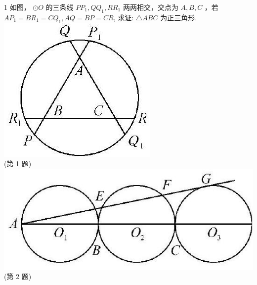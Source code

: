 \documentclass[10pt]{article}
\begin{document}
1 如图， $\odot O$ 的三条线 $P P_{1}, Q Q_{1}, R R_{1}$ 两两相交，交点为 $A, B, C$ ，若 $A P_{1}=B R_{1}=C Q_{1}, A Q=B P=C R$, 求证: $\triangle A B C$ 为正三角形.\\
\includegraphics[max width=\textwidth, center]{2024_10_30_66b8e5e701da2093c133g-056(2)}\\
(第 1 题)\\
\includegraphics[max width=\textwidth, center]{2024_10_30_66b8e5e701da2093c133g-056(1)}\\
(第 2 题)
\end{document}
